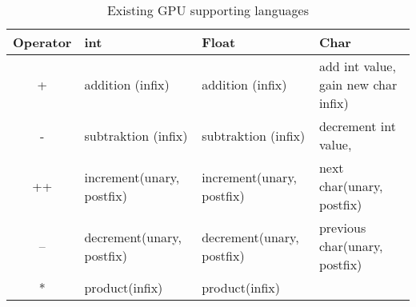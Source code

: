 \begin{table}[h]
	\centering
	\begin{tabular}{|c|l|l|l|}
	\hline
	\textbf{Operator} & \textbf{int}       & \textbf{Float} & \textbf{Char}			  		           \\ \hline
	+   & addition (infix)                 & addition (infix)                  & add int value, gain new char infix)         \\ \hline
	-   & subtraktion (infix)              & subtraktion (infix)               & decrement int value,                        \\ \hline
	++  & increment(unary, postfix)        & increment(unary, postfix)         & next char(unary, postfix)             \\ \hline
	--  & decrement(unary, postfix)        & decrement(unary, postfix)         & previous char(unary, postfix)         \\ \hline
	*   & product(infix)                   & product(infix)                    &                                             \\ \hline
	\end{tabular}
	\caption{Existing GPU supporting languages}
	\label{tbl:operators}
\end{table}
\vspace{-20pt}
